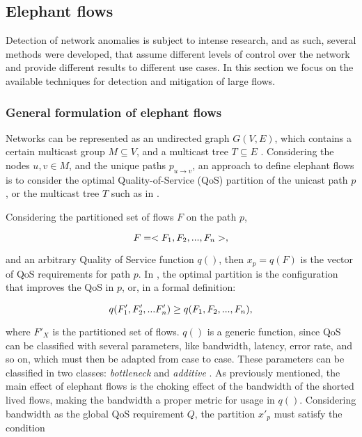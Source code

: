 \subsection {Elephant flows} \label{sec:el_fl}

Detection of network anomalies is subject to intense research, and as such, several methods were developed, that assume different levels of control over the network 
and provide different results to different use cases. In this section we focus on the available techniques for detection and mitigation of large flows.

\subsubsection{General formulation of elephant flows}

Networks can be represented as an undirected graph $G(V, E)$, which contains a certain multicast group $M \subseteq V$, and a multicast tree $T \subseteq E$ 
\cite{lorenz_optimal_2003}. Considering the nodes $u, v \in M$, and the unique paths $p_{u \to v}$, an approach to define elephant flows
is to consider the optimal Quality-of-Service (QoS) partition of the unicast path $p$, or the multicast tree $T$ such as in 
\cite{lorenz_optimal_2003, lorenz_optimal_2002}. 

\par Considering the partitioned set of flows $F$ on the path $p$,

\begin{equation*}
    \centering
    F = <F_1, F_2, ..., F_n>,
\end{equation*}

\par and an arbitrary Quality of Service function $q()$, then $x_p = q(F)$ is the vector of QoS requirements 
for path $p$. In \cite{ros-giralt_mathematical_2017}, the optimal partition is the configuration that improves the QoS in $p$, or, in a formal
definition:

\begin{equation*}
    \centering
    q(F'_1, F'_2, ... F'_n) \geq q(F_1, F_2, ..., F_n),
\end{equation*}

\par where $F'_{X}$ is the partitioned set of flows. $q()$ is a generic function, since QoS can be classified with several parameters, like bandwidth, latency,
error rate, and so on, which must then be adapted from case to case. These parameters can be classified in two classes: \textit{bottleneck} and \textit{additive} 
\cite{lorenz_optimal_2003}. As previously mentioned, the main effect of elephant flows is the choking effect of the bandwidth
of the shorted lived flows, making the bandwidth a proper metric for usage in $q()$. Considering bandwidth as the global QoS requirement $Q$, the partition $x'_p$ 
must satisfy the condition

